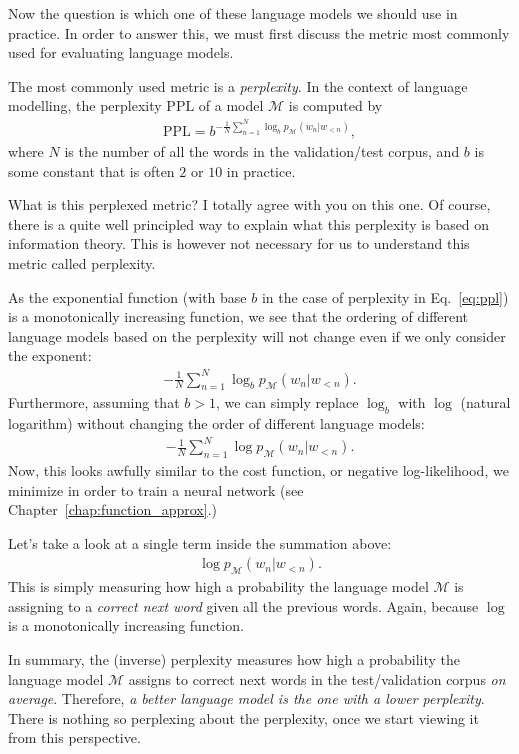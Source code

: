\documentclass{report}
\newcommand{\MM}[0]{\mathcal{M}}
\newcommand{\PPL}{\text{PPL}}
\begin{document}
Now the question is which one of these language models we should use in practice.
In order to answer this, we must first discuss the metric most commonly used for
evaluating language models.

The most commonly used metric is a {\em perplexity}. In the context of language
modelling, the perplexity $\PPL$ of a model $\MM$ is computed by
\begin{align}
    \label{eq:ppl}
    \PPL = {b}^{-\frac{1}{N} \sum_{n=1}^N \log_{b} p_{\MM}(w_n | w_{<n})},
\end{align}
where $N$ is the number of all the words in the validation/test corpus, and $b$
is some constant that is often $2$ or $10$ in practice. 

What is this perplexed metric? I totally agree with you on this one. Of course,
there is a quite well principled way to explain what this perplexity is based on
information theory. This is however not necessary for us to understand this
metric called perplexity. 

As the exponential function (with base $b$ in the case of perplexity in
Eq.~\eqref{eq:ppl}) is a monotonically increasing function, we see that the
ordering of different language models based on the perplexity will not change
even if we only consider the exponent: 
\begin{align*}
    -\frac{1}{N} \sum_{n=1}^N \log_{b} p_{\MM}(w_n | w_{<n}).
\end{align*}
Furthermore, assuming that $b > 1$, we can simply replace $\log_b$ with $\log$
(natural logarithm) without changing the order of different language models:
\begin{align*}
    -\frac{1}{N} \sum_{n=1}^N \log p_{\MM}(w_n | w_{<n}).
\end{align*}
Now, this looks awfully similar to the cost function, or negative
log-likelihood, we minimize in order to train a neural network (see
Chapter~\ref{chap:function_approx}.)

Let's take a look at a single term inside the summation above:
\begin{align*}
    \log p_{\MM}(w_n | w_{<n}).
\end{align*}
This is simply measuring how high a probability the language model $\MM$ is
assigning to a {\em correct next word} given all the previous words. Again,
because $\log$ is a monotonically increasing function.

In summary, the (inverse) perplexity measures how high a probability the
language model $\MM$ assigns to correct next words in the test/validation corpus
{\em on average}.  Therefore, {\em a better language model is the one with a lower
perplexity}.  There is nothing so perplexing about the perplexity, once we start
viewing it from this perspective.
\end{document}
